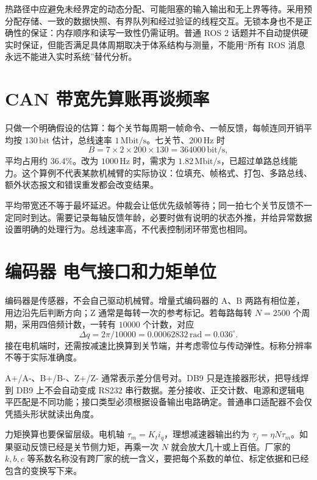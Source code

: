 热路径中应避免未经界定的动态分配、可能阻塞的输入输出和无上界等待。采用预分配存储、一致的数据快照、有界队列和经过验证的线程交互。无锁本身也不是正确性的保证：内存顺序和读写一致性仍需证明。普通 ROS 2 话题并不自动提供硬实时保证，但能否满足具体周期取决于体系结构与测量，不能用“所有 ROS 消息永远不能进入实时系统”替代分析。

\section{CAN 带宽先算账再谈频率}

只做一个明确假设的估算：每个关节每周期一帧命令、一帧反馈，每帧连同开销平均按 $130\,\mathrm{bit}$ 估计，总线速率 $1\,\mathrm{Mbit/s}$。七关节、$200\,\mathrm{Hz}$ 时
\begin{equation}
B=7\times2\times200\times130=364000\,\mathrm{bit/s},
\end{equation}
平均占用约 $36.4\%$。改为 $1000\,\mathrm{Hz}$ 时，需求为 $1.82\,\mathrm{Mbit/s}$，已超过单路总线能力。这个算例不代表某款机械臂的实际协议：位填充、帧格式、打包、多路总线、额外状态报文和错误重发都会改变结果。

平均带宽还不等于最坏延迟。仲裁会让低优先级帧等待；同一拍七个关节反馈不一定同时到达。需要记录每轴反馈年龄，必要时做有说明的状态外推，并给异常数据设置明确的处理行为。总线速率高，不代表控制闭环带宽也相同。

\section{编码器 电气接口和力矩单位}

编码器是传感器，不会自己驱动机械臂。增量式编码器的 A、B 两路有相位差，用边沿先后判断方向；Z 通常是每转一次的参考标记。若每路每转 $N=2500$ 个周期，采用四倍频计数，一转有 $10000$ 个计数，对应
\begin{equation}
\Delta q=2\pi/10000=0.00062832\,\mathrm{rad}=0.036^\circ.
\end{equation}
接在电机端时，还需按减速比换算到关节端，并考虑零位与传动弹性。标称分辨率不等于实际准确度。

A+/A-、B+/B-、Z+/Z- 通常表示差分信号对。DB9 只是连接器形状，把导线焊到 DB9 上不会自动变成 RS232 串行数据。差分接收、正交计数、电源和逻辑电平匹配是不同功能；接口类型必须根据设备输出电路确定。普通串口适配器不会仅凭插头形状就读出角度。

力矩换算也要保留层级。电机轴 $\tau_m=K_ti_q$，理想减速器输出约为 $\tau_j=\eta N\tau_m$。如果驱动反馈已经是关节侧力矩，再乘一次 $N$ 就会放大几十或上百倍。厂家的 $k,b,c$ 等系数名称没有跨厂家的统一含义，要把每个系数的单位、标定依据和已经包含的变换写下来。

